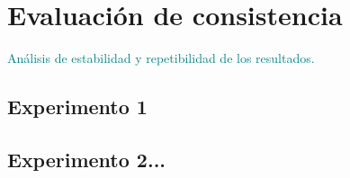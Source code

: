 \section{Evaluación de consistencia}
\textcolor{teal}{Análisis de estabilidad y repetibilidad de los resultados.}
\subsection{Experimento 1}
\subsection{Experimento 2...}
